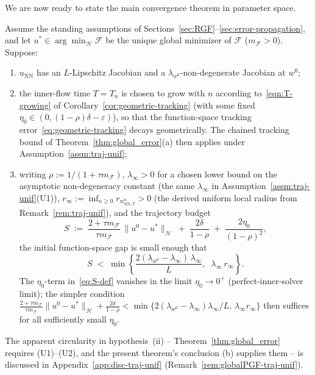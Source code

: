 \documentclass[twoside,11pt]{article}
\newcommand{\NN}{\mathrm{NN}}
\newcommand{\calF}{\mathcal{F}}
\newcommand{\calH}{\mathcal{H}}
\begin{document}
We are now ready to state the main convergence theorem in parameter space.

\begin{theorem}
\label{thm:global-PGF}
Assume the standing assumptions of Sections~\ref{sec:RGF}--\ref{sec:error-propagation}, and let
$u^*\in\arg\min_{\calH}\calF$ be the unique global minimizer of $\calF$ ($m_\calF>0$).
Suppose:
\begin{enumerate}
\item[(i)] $u_\NN$ has an $L$-Lipschitz Jacobian and a $\lambda_{w^0}$-non-degenerate Jacobian at $w^0$;
\item[(ii)] the inner-flow time $T=T_n$ is chosen to grow with $n$ according to~\eqref{eqn:T-growing} of Corollary~\ref{cor:geometric-tracking} (with some fixed $\eta_0\in(0,(1-\rho)\delta-\varepsilon)$), so that the function-space tracking error~\eqref{eq:geometric-tracking} decays geometrically. The chained tracking bound of Theorem~\ref{thm:global_error}(a) then applies under Assumption~\ref{assm:traj-unif};
\item[(iii)] writing $\rho:=1/(1+\tau m_\calF)$, $\lambda_\infty>0$ for a chosen lower bound on the asymptotic non-degeneracy constant (the same $\lambda_\infty$ in Assumption~\ref{assm:traj-unif}(U1)), $r_\infty:=\inf_{n\ge 0}r_{w^n_{\NN,T}}>0$ (the derived uniform local radius from Remark~\ref{rem:traj-unif}), and the trajectory budget
\begin{equation}\label{eq:S-def}
S \;:=\; \frac{2+\tau m_\calF}{\tau m_\calF}\,\|u^0-u^*\|_\calH \;+\; \frac{2\delta}{1-\rho} \;+\; \frac{2\eta_0}{(1-\rho)^2},
\end{equation}
the initial function-space gap is small enough that
\begin{equation}\label{eq:initial-gap-condition}
S \;<\; \min\!\left\{\frac{2(\lambda_{w^0}-\lambda_\infty)\,\lambda_\infty}{L},\;\;\lambda_\infty\,r_\infty\right\}.
\end{equation}
The $\eta_0$-term in~\eqref{eq:S-def} vanishes in the limit $\eta_0\to 0^+$ (perfect-inner-solver limit); the simpler condition $\frac{2+\tau m_\calF}{\tau m_\calF}\|u^0-u^*\|_\calH+\frac{2\delta}{1-\rho}<\min\{2(\lambda_{w^0}-\lambda_\infty)\lambda_\infty/L,\,\lambda_\infty r_\infty\}$ then suffices for all sufficiently small $\eta_0$.
\end{enumerate}

The apparent circularity in hypothesis~(ii) -- Theorem~\ref{thm:global_error} requires (U1)--(U2), and the present theorem's conclusion (b) supplies them -- is discussed in Appendix~\ref{app:disc-traj-unif} (Remark~\ref{rem:globalPGF-traj-unif}).


\end{theorem}
\end{document}
